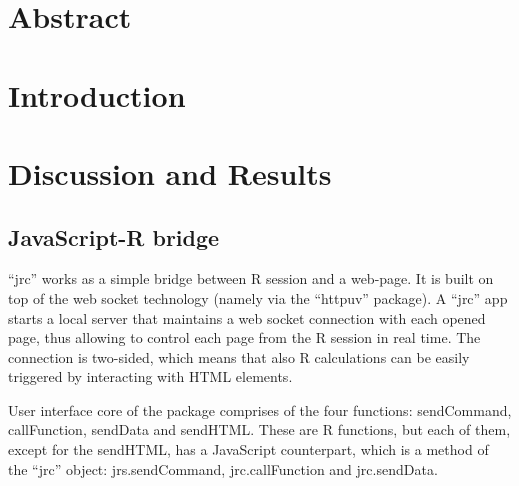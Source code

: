 \documentclass[twocolumn,10pt]{article}
\begin{document}
\setcounter{secnumdepth}{0}



\section{Abstract}

\section{Introduction}

\section{Discussion and Results}
\subsection{JavaScript-R bridge}

``jrc'' works as a simple bridge between R session and a web-page. It is built on top of the web socket technology (namely via the ``httpuv'' package). A ``jrc'' app starts a local server that maintains a web socket connection with each opened page, thus allowing to control each page from the R session in real time. The connection is two-sided, which means that also R calculations can be easily triggered by interacting with HTML elements.

User interface core of the package comprises of the four functions: sendCommand, callFunction, sendData and sendHTML. These are R functions, but each of them, except for the sendHTML, has a JavaScript counterpart, which is a method of the ``jrc'' object: jrs.sendCommand, jrc.callFunction and jrc.sendData. 
 
\end{document}
